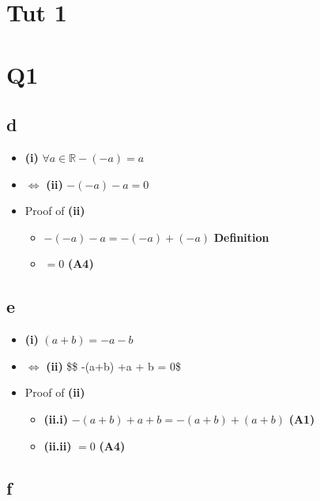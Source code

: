 \documentclass[]{article}
\date{}
\providecommand{\tightlist}{%
  \setlength{\itemsep}{0pt}\setlength{\parskip}{0pt}}
\begin{document}
\hypertarget{tut-1}{%
\section{Tut 1}\label{tut-1}}

\hypertarget{q1}{%
\section{Q1}\label{q1}}

\hypertarget{d}{%
\subsection{d}\label{d}}

\begin{itemize}
\tightlist
\item
  \textbf{(i)} \(\forall a \in \mathbb{R} -(-a) = a\)
\item
  \(\iff\) \textbf{(ii)} \(-(-a) -a = 0\)
\item
  Proof of \textbf{(ii)}

  \begin{itemize}
  \tightlist
  \item
    \(-(-a) -a = -(-a) + (-a)\) \textbf{Definition}
  \item
    \(=0\) \textbf{(A4)}
  \end{itemize}
\end{itemize}

\hypertarget{e}{%
\subsection{e}\label{e}}

\begin{itemize}
\tightlist
\item
  \textbf{(i)} \((a+b) = -a -b\)
\item
  \(\iff\) \textbf{(ii)} \$\$ -(a+b) +a + b = 0\$
\item
  Proof of \textbf{(ii)}

  \begin{itemize}
  \tightlist
  \item
    \textbf{(ii.i)} \(-(a+b) + a + b = -(a+b) + (a + b)\) \textbf{(A1)}
  \item
    \textbf{(ii.ii)} \(=0\) \textbf{(A4)}
  \end{itemize}
\end{itemize}

\hypertarget{f}{%
\subsection{f}\label{f}}
\end{document}
